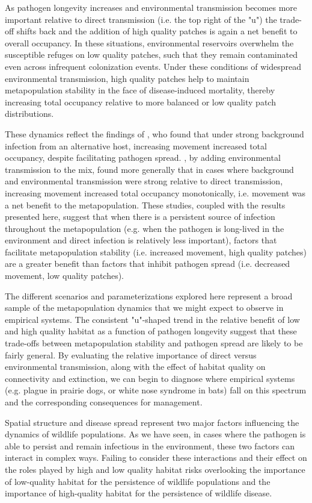 \documentclass{svjour3}
\begin{document}
As pathogen longevity increases and environmental transmission becomes more important relative to direct transmission (i.e. the top right of the "u") the trade-off shifts back and the addition of high quality patches is again a net benefit to overall occupancy.  In these situations, environmental reservoirs overwhelm the susceptible refuges on low quality patches, such that they remain contaminated even across infrequent colonization events.  Under these conditions of widespread environmental transmission, high quality patches help to maintain metapopulation stability in the face of disease-induced mortality, thereby increasing total occupancy relative to more balanced or low quality patch distributions.  

These dynamics reflect the findings of \cite{Gog2002}, who found that under strong background infection from an alternative host, increasing movement increased total occupancy, despite facilitating pathogen spread.  \cite{Park2012}, by adding environmental transmission to the mix, found more generally that in cases where background and environmental transmission were strong relative to direct transmission, increasing movement increased total occupancy monotonically, i.e. movement was a net benefit to the metapopulation.  These studies, coupled with the results presented here, suggest that when there is a persistent source of infection throughout the metapopulation (e.g. when the pathogen is long-lived in the environment and direct infection is relatively less important), factors that facilitate metapopulation stability (i.e. increased movement, high quality patches) are a greater benefit than factors that inhibit pathogen spread (i.e. decreased movement, low quality patches).   

The different scenarios and parameterizations explored here represent a broad sample of the metapopulation dynamics that we might expect to observe in empirical systems.  The consistent "u"-shaped trend in the relative benefit of low and high quality habitat as a function of pathogen longevity suggest that these trade-offs between metapopulation stability and pathogen spread are likely to be fairly general.  By evaluating the relative importance of direct versus environmental transmission, along with the effect of habitat quality on connectivity and extinction, we can begin to diagnose where empirical systems (e.g. plague in prairie dogs, or white nose syndrome in bats) fall on this spectrum and the corresponding consequences for management.

Spatial structure and disease spread represent two major factors influencing the dynamics of wildlife populations.  As we have seen, in cases where the pathogen is able to persist and remain infectious in the environment, these two factors can interact in complex ways.  Failing to consider these interactions and their effect on the roles played by high and low quality habitat risks overlooking the importance of low-quality habitat for the persistence of wildlife populations and the importance of high-quality habitat for the persistence of wildlife disease.
\end{document}

